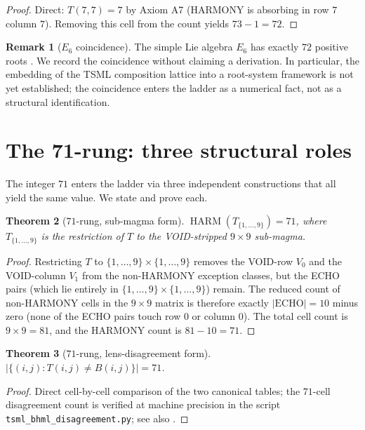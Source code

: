 \documentclass[11pt,reqno]{amsart}
\newtheorem{theorem}{Theorem}[section]
\theoremstyle{definition}
\newtheorem{remark}[theorem]{Remark}
\DeclareMathOperator{\HARM}{HARM}
\begin{document}
\begin{proof}
Direct: $T(7, 7) = 7$ by Axiom A7 (HARMONY is absorbing in row $7$
column $7$). Removing this cell from the count yields $73 - 1 = 72$.
\end{proof}

\begin{remark}[$E_6$ coincidence]
\label{rem:e6}
The simple Lie algebra $E_6$ has exactly $72$ positive roots
\cite{Bourbaki1968,FultonHarris1991}. We record the coincidence
without claiming a derivation. In particular, the embedding of the
TSML composition lattice into a root-system framework is not yet
established; the coincidence enters the ladder as a numerical
fact, not as a structural identification.
\end{remark}

\section{The 71-rung: three structural roles}
\label{sec:71}

The integer $71$ enters the ladder via three independent constructions
that all yield the same value. We state and prove each.

\begin{theorem}[$71$-rung, sub-magma form]
\label{thm:71-submagma}
$\HARM(T_{\{1,\ldots,9\}}) = 71$, where
$T_{\{1,\ldots,9\}}$ is the restriction of $T$ to the
VOID-stripped $9 \times 9$ sub-magma.
\end{theorem}

\begin{proof}
Restricting $T$ to $\{1, \ldots, 9\} \times \{1, \ldots, 9\}$
removes the VOID-row $V_0$ and the VOID-column $V_1$ from the
non-HARMONY exception classes, but the ECHO pairs (which lie
entirely in $\{1, \ldots, 9\} \times \{1, \ldots, 9\}$) remain.
The reduced count of non-HARMONY cells in the $9 \times 9$ matrix
is therefore exactly $|\mathrm{ECHO}| = 10$ minus zero (none of
the ECHO pairs touch row $0$ or column $0$). The total cell count
is $9 \times 9 = 81$, and the HARMONY count is
$81 - 10 = 71$.
\end{proof}

\begin{theorem}[$71$-rung, lens-disagreement form]
\label{thm:71-disagree}
$|\{(i, j) : T(i, j) \neq B(i, j)\}| = 71$.
\end{theorem}

\begin{proof}
Direct cell-by-cell comparison of the two canonical tables; the
$71$-cell disagreement count is verified at machine precision in
the script \texttt{tsml\_bhml\_disagreement.py}; see also
\cite{Sanders2026LensInvariance}.
\end{proof}
\end{document}
